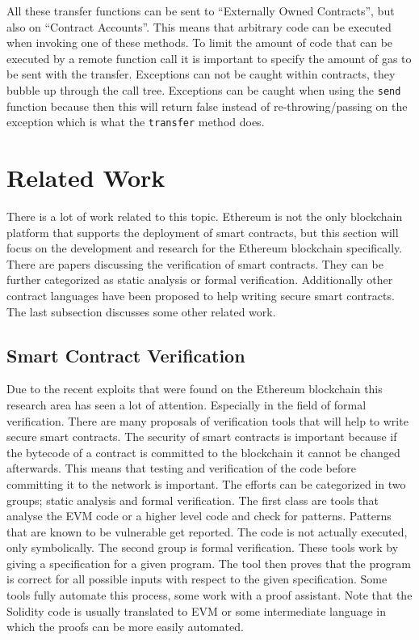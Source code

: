\documentclass[a4paper]{article}
\begin{document}
All these transfer functions can be sent to ``Externally Owned Contracts'', but also on ``Contract Accounts''. This means that arbitrary code can be executed when invoking one of these methods. To limit the amount of code that can be executed by a remote function call it is important to specify the amount of gas to be sent with the transfer. Exceptions can not be caught within contracts, they bubble up through the call tree. Exceptions can be caught when using the \texttt{send} function because then this will return false instead of re-throwing/passing on the exception which is what the \texttt{transfer} method does.

\newpage
\section{Related Work}
\label{sec:RelatedWork}
There is a lot of work related to this topic. Ethereum is not the only blockchain platform that supports the deployment of smart contracts, but this section will focus on the development and research for the Ethereum blockchain specifically. There are papers discussing the verification of smart contracts. They can be further categorized as static analysis or formal verification. Additionally other contract languages have been proposed to help writing secure smart contracts. The last subsection discusses some other related work.

\subsection{Smart Contract Verification}
Due to the recent exploits that were found on the Ethereum blockchain this research area has seen a lot of attention. Especially in the field of formal verification. There are many proposals of verification tools that will help to write secure smart contracts. The security of smart contracts is important because if the bytecode of a contract is committed to the blockchain it cannot be changed afterwards. This means that testing and verification of the code before committing it to the network is important. The efforts can be categorized in two groups; static analysis and formal verification. The first class are tools that analyse the EVM code or a higher level code and check for patterns. Patterns that are known to be vulnerable get reported. The code is not actually executed, only symbolically. The second group is formal verification. These tools work by giving a specification for a given program. The tool then proves that the program is correct for all possible inputs with respect to the given specification. Some tools fully automate this process, some work with a proof assistant. Note that the Solidity code is usually translated to EVM or some intermediate language in which the proofs can be more easily automated.
\end{document}
